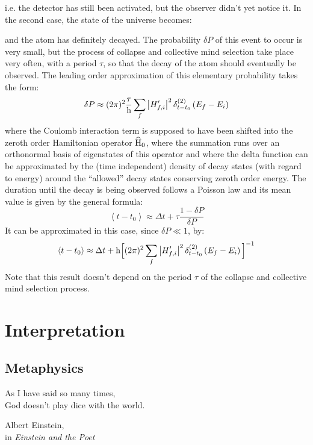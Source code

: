 \documentclass[10pt,a4paper,twoside,openany]{book}
\begin{document}
i.e. the detector has still been activated, but the observer didn't yet notice it. In the second case, the state of the universe becomes:
\begin{flushleft}
\Atom\hspace*{3mm}\DetectorOn\hspace*{3mm}\ObserverOn
\end{flushleft}
and the atom has definitely decayed. The probability $\delta P$ of this event to occur is very small, but the process of collapse and collective mind selection take place very often, with a period $\tau$, so that the decay of the atom should eventually be observed. The leading order approximation of this elementary probability takes the form:
\begin{equation*}
\delta P \approx ( 2 \pi )^2 \frac\tau{\mathrm h} \sum_f \left| H'_{f,i} \right|^2 \delta^{({2})}_{t - t_0} \left({E_f - E_i}\right)
\end{equation*}
where the Coulomb interaction term is supposed to have been shifted into the zeroth order Hamiltonian operator $\widehat{\mathrm H}_0$, where the summation runs over an orthonormal basis of eigenstates of this operator and where the delta function can be approximated by the (time independent) density of decay states (with regard to energy) around the ``allowed'' decay states conserving zeroth order energy. The duration until the decay is being observed follows a Poisson law and its mean value is given by the general formula:
\begin{equation*}
\left< t - t_0 \right> \approx \Delta t + \tau \frac{1 - \delta P}{\delta P}
\end{equation*}
It can be approximated in this case, since $\delta P \ll 1$, by:
\begin{equation*}
\left< t - t_0 \right> \approx \Delta t + \mathrm h \Big[ ( 2 \pi )^2 \sum_f \left| H'_{f,i} \right|^2 \delta^{({2})}_{t - t_0} \left({E_f - E_i}\right) \Big]^{-1}
\end{equation*}
Note that this result doesn't depend on the period $\tau$ of the collapse and collective mind selection process.

\part{Interpretation}

\chapter{Metaphysics}
\label{Metaphysics}

\renewcommand{\epigraphwidth}{6cm}
\epigraph{As I have said so many times,\\God doesn't play dice with the world.}{Albert Einstein, \\ in \textit{Einstein and the Poet}~\cite{Hermanns1983}}
\end{document}
